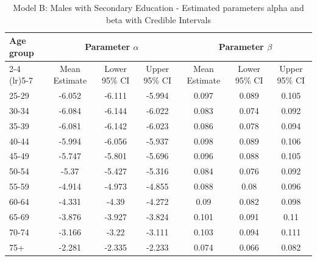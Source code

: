 \begin{landscape}
\begin{table}[htbp]
\centering
\caption{Model B: Males with Secondary Education - Estimated parameters alpha and beta  with Credible Intervals}
\label{tab:parameters_ab15}
\begin{tabular}{@{}lcccccc@{}}
\toprule
Age group & \multicolumn{3}{c}{Parameter \(\alpha\)} & \multicolumn{3}{c}{Parameter \(\beta\)} \\ 
\cmidrule(lr){2-4} \cmidrule(lr){5-7}
          & Mean Estimate & Lower 95\% CI & Upper 95\% CI & Mean Estimate & Lower 95\% CI & Upper 95\% CI \\ 
\midrule
25-29 & -6.052 & -6.111 & -5.994 & 0.097 & 0.089 & 0.105 \\
30-34 & -6.084 & -6.144 & -6.022 & 0.083 & 0.074 & 0.092 \\
35-39 & -6.081 & -6.142 & -6.023 & 0.086 & 0.078 & 0.094 \\
40-44 & -5.994 & -6.056 & -5.937 & 0.098 & 0.089 & 0.106 \\
45-49 & -5.747 & -5.801 & -5.696 & 0.096 & 0.088 & 0.105 \\
50-54 & -5.37 & -5.427 & -5.316 & 0.084 & 0.076 & 0.092 \\
55-59 & -4.914 & -4.973 & -4.855 & 0.088 & 0.08 & 0.096 \\
60-64 & -4.331 & -4.39 & -4.272 & 0.09 & 0.082 & 0.098 \\
65-69 & -3.876 & -3.927 & -3.824 & 0.101 & 0.091 & 0.11 \\
70-74 & -3.166 & -3.22 & -3.111 & 0.103 & 0.094 & 0.111 \\
75+ & -2.281 & -2.335 & -2.233 & 0.074 & 0.066 & 0.082 \\
\bottomrule
\end{tabular}
\end{table}
\end{landscape}